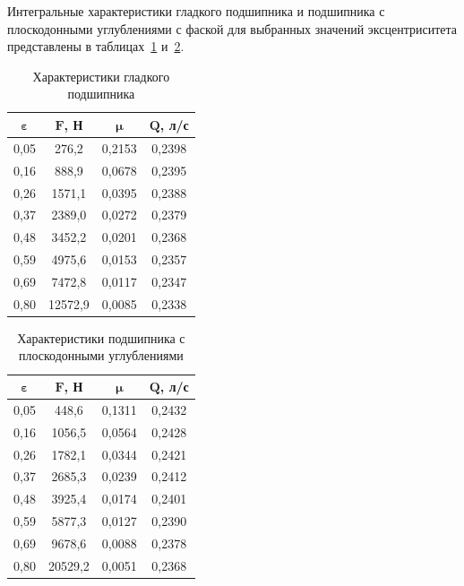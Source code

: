 Интегральные характеристики гладкого подшипника и подшипника с плоскодонными углублениями с фаской для выбранных значений эксцентриситета представлены в таблицах~\ref{tab:smooth_results} и~\ref{tab:textured_results}.

\begin{table}[H]
\small
\centering
\caption{Характеристики гладкого подшипника}
\label{tab:smooth_results}
\begin{tabular}{|c|c|c|c|}
\hline
$\boldsymbol{\varepsilon}$ & $\boldsymbol{F}$\textbf{, Н} & $\boldsymbol{\mu}$ & $\boldsymbol{Q}$\textbf{, л/с} \\
\hline
0{,}05 & 276{,}2 & 0{,}2153 & 0{,}2398 \\
\hline
0{,}16 & 888{,}9 & 0{,}0678 & 0{,}2395 \\
\hline
0{,}26 & 1571{,}1 & 0{,}0395 & 0{,}2388 \\
\hline
0{,}37 & 2389{,}0 & 0{,}0272 & 0{,}2379 \\
\hline
0{,}48 & 3452{,}2 & 0{,}0201 & 0{,}2368 \\
\hline
0{,}59 & 4975{,}6 & 0{,}0153 & 0{,}2357 \\
\hline
0{,}69 & 7472{,}8 & 0{,}0117 & 0{,}2347 \\
\hline
0{,}80 & 12572{,}9 & 0{,}0085 & 0{,}2338 \\
\hline
\end{tabular}
\end{table}

\begin{table}[H]
\small
\centering
\caption{Характеристики подшипника с плоскодонными углублениями}
\label{tab:textured_results}
\begin{tabular}{|c|c|c|c|}
\hline
$\boldsymbol{\varepsilon}$ & $\boldsymbol{F}$\textbf{, Н} & $\boldsymbol{\mu}$ & $\boldsymbol{Q}$\textbf{, л/с} \\
\hline
0{,}05 & 448{,}6 & 0{,}1311 & 0{,}2432 \\
\hline
0{,}16 & 1056{,}5 & 0{,}0564 & 0{,}2428 \\
\hline
0{,}26 & 1782{,}1 & 0{,}0344 & 0{,}2421 \\
\hline
0{,}37 & 2685{,}3 & 0{,}0239 & 0{,}2412 \\
\hline
0{,}48 & 3925{,}4 & 0{,}0174 & 0{,}2401 \\
\hline
0{,}59 & 5877{,}3 & 0{,}0127 & 0{,}2390 \\
\hline
0{,}69 & 9678{,}6 & 0{,}0088 & 0{,}2378 \\
\hline
0{,}80 & 20529{,}2 & 0{,}0051 & 0{,}2368 \\
\hline
\end{tabular}
\end{table}

